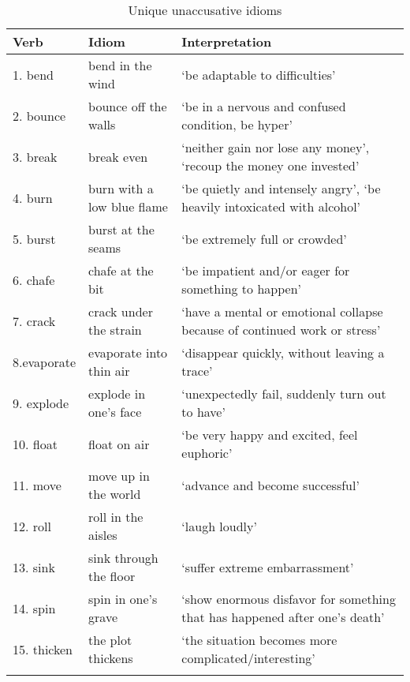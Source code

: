 \documentclass[output=paper]{langsci/langscibook}
\begin{document}
\largerpage
\begin{table}[H]
\small
\caption{Unique unaccusative idioms}
\begin{tabularx}{\textwidth}{llQ}
\lsptoprule
{Verb} & {Idiom} & {Interpretation} \\
\midrule
{1. bend}  & bend in the wind & ‘be adaptable to difficulties’\\
{2. bounce}  & bounce off the walls & ‘be in a nervous and confused condition, be hyper’\\
{3. break}  & break even & ‘neither gain nor lose any money’, ‘recoup the money one invested’\\
{4. burn}  & burn with a low blue flame & ‘be quietly and intensely angry’, ‘be heavily intoxicated with alcohol’ \\
{5. burst}  & burst at the seams & ‘be extremely full or crowded’  \\
{6. chafe}  & chafe at the bit & ‘be impatient and/or eager for something to happen’\\
{7. crack}  & crack under the strain & ‘have a mental or emotional collapse because of continued work or stress’\\
{8.evaporate} & evaporate into thin air & ‘disappear quickly, without leaving a trace’\\
{9. explode}  & explode in one’s face & ‘unexpectedly fail, suddenly turn out to have’\\
{10. float}  & float on air & ‘be very happy and excited, feel euphoric’\\
{11. move}  & move up in the world & ‘advance and become successful’ \\
{12. roll}  & roll in the aisles & ‘laugh loudly’ \\
{13. sink} & sink through the floor & ‘suffer extreme embarrassment’\\
{14. spin}  & spin in one’s grave & ‘show enormous disfavor for something that has happened after one's death’\\
{15. thicken}  & the plot thickens & ‘the situation becomes more complicated\slash  interesting’\\
\lspbottomrule
\end{tabularx}
\end{table}
\end{document}
